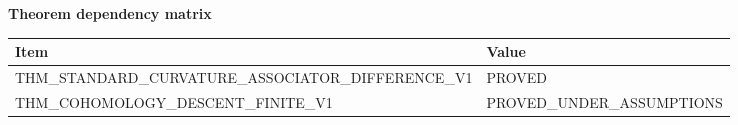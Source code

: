 \begin{center}
\textbf{Theorem dependency matrix}\par\smallskip
\begin{tabular}{ll}
\toprule
Item & Value \\
\midrule
THM\_STANDARD\_CURVATURE\_ASSOCIATOR\_DIFFERENCE\_V1 & PROVED \\
THM\_COHOMOLOGY\_DESCENT\_FINITE\_V1 & PROVED\_UNDER\_ASSUMPTIONS \\
\bottomrule
\end{tabular}
\end{center}
